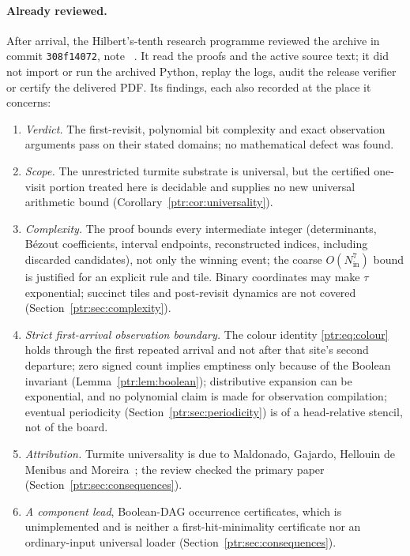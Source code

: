 \documentclass[11pt,letterpaper]{article}
\theoremstyle{definition}\newtheorem{definition}[theorem]{Definition}
\theoremstyle{remark}\newtheorem{remark}[theorem]{Remark}
\begin{document}
\paragraph{Already reviewed.} After arrival, the Hilbert's-tenth research
programme reviewed the archive in commit \texttt{308f14072}, note
~\cite{review38}.
It read the proofs and the active source text; it did not import or run the
archived Python, replay the logs, audit the release verifier or certify the
delivered PDF. Its findings, each also recorded at the place it concerns:
\begin{enumerate}
\item \emph{Verdict.} The first-revisit, polynomial bit complexity and exact
observation arguments pass on their stated domains; no mathematical defect
was found.
\item \emph{Scope.} The unrestricted turmite substrate is universal, but the
certified one-visit portion treated here is decidable and supplies no new
universal arithmetic bound (Corollary~\ref{ptr:cor:universality}).
\item \emph{Complexity.} The proof bounds every intermediate integer
(determinants, B\'ezout coefficients, interval endpoints, reconstructed
indices, including discarded candidates), not only the winning event; the
coarse $O(N_{\mathrm{in}}^7)$ bound is justified for an explicit rule and
tile. Binary coordinates may make $\tau$ exponential; succinct tiles and
post-revisit dynamics are not covered (Section~\ref{ptr:sec:complexity}).
\item \emph{Strict first-arrival observation boundary.} The colour identity
\eqref{ptr:eq:colour} holds through the first repeated arrival and not after
that site's second departure; zero signed count implies emptiness only
because of the Boolean invariant (Lemma~\ref{ptr:lem:boolean}); distributive
expansion can be exponential, and no polynomial claim is made for
observation compilation; eventual periodicity
(Section~\ref{ptr:sec:periodicity}) is of a head-relative stencil, not of
the board.
\item \emph{Attribution.} Turmite universality is due to Maldonado,
Gajardo, Hellouin de Menibus and Moreira~\cite{maldonado}; the review
checked the primary paper (Section~\ref{ptr:sec:consequences}).
\item \emph{A component lead}, Boolean-DAG occurrence certificates, which is
unimplemented and is neither a first-hit-minimality certificate nor an
ordinary-input universal loader (Section~\ref{ptr:sec:consequences}).
\end{enumerate}
\end{document}
